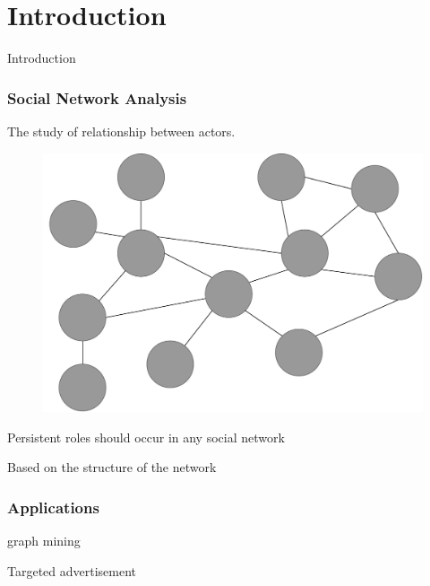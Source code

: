 \section{Introduction}

\begin{frame}
     \begin{center}
     	\huge Introduction
     \end{center}
\end{frame}

\begin{frame}
\frametitle{Social Network Analysis}
The study of relationship between actors.

\begin{figure}
\includegraphics[scale=0.25]{graphics/social_network.pdf}
\end{figure}

\end{frame}

\begin{frame}

Persistent roles should occur in any social network

Based on the structure of the network

\end{frame}

\begin{frame}
	\frametitle{Applications}
	graph mining
	
	Targeted advertisement 
\end{frame}


